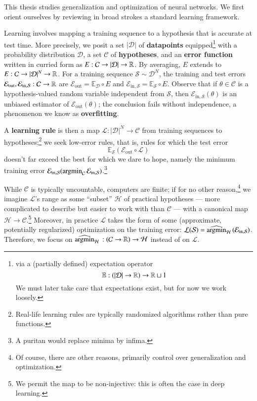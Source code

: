 \documentclass[openany, notitlepage, justified]{tufte-book}
\theoremstyle{plain}
\theoremstyle{definition}
\newcommand{\argmin}{\text{\textnormal{argmin}}}
\newcommand{\Cc}{\mathcal{C}}   \newcommand{\CC}{\mathbb{C}}
\newcommand{\Dd}{\mathcal{D}}
\newcommand{\Ee}{\mathcal{E}}   \newcommand{\EE}{\mathbb{E}}
\newcommand{\Hh}{\mathcal{H}}
\newcommand{\Ll}{\mathcal{L}}
\newcommand{\Ss}{\mathcal{S}}
\begin{document}
        This thesis studies generalization and optimization of neural networks.
        We first orient ourselves by reviewing in broad strokes a
        standard\cite{ab12, ra19} learning framework.

        \newcommand{\Eout}{\Ee_{\text{out}}}
        \newcommand{\Ein }{\Ee_{\text{in},\Ss}}
        \newcommand{\optH}{\widehat{\argmin}_{\Hh}\,}
        \newcommand{\amH }{\argmin_{\Hh}\,}
        \newcommand{\amC }{\argmin_{\Cc}\,}

        Learning involves mapping a training sequence to a hypothesis that is
        accurate at test time.  More precisely, we posit a set $|\Dd|$ of
        \textbf{datapoints} equipped\footnote{
            via a (partially defined) expectation operator
            $$\EE:(|\Dd|\to\RR)\to\RR\sqcup 1$$ 
            We must later take care that expectations exist, but
            for now we work loosely.
        } with a probability distribution $\Dd$,
        a set $\Cc$ of \textbf{hypotheses}, and an \textbf{error
        function} written in curried form as $E:\Cc\to|\Dd|\to\RR$.
        By averaging, $E$ extends to $E:\Cc\to|\Dd|^N\to\RR$.  For a
        training sequence $\Ss \sim \Dd^N$, the training and test
        errors $\Eout, \Ein: \Cc\to \RR$ are $\Eout = \EE_{\Dd} \circ E$ and
        $\Ein = \EE_{\Ss} \circ E$.  Observe that if $\theta\in \Cc$ is a
        hypothesis-valued random variable independent from $\Ss$, then
        $\Ein(\theta)$ is an unbiased estimator of $\Eout(\theta)$; the
        conclusion fails without independence, a phenomenon we know as
        \textbf{overfitting}.

        A \textbf{learning rule} is then a
        map $\Ll:|\Dd|^N\to \Cc$ from training sequences to hypotheses;\footnote{
            Real-life learning rules are typically randomized algorithms rather
            than pure functions.
        } we seek low-error rules, that is, rules for which the test error
        $$
            \EE_{\Ss}(\Eout \circ \Ll)
        $$
        doesn't far exceed the best for which we dare to hope, namely the
        minimum training error $\Ein(\amC\Ein)$.\footnote{
            A puritan would replace minima by infima.
        }

        While $\Cc$ is typically uncountable, computers are finite; if for no
        other reason,\footnote{
            Of course, there are other reasons, primarily control over
            generalization and optimization.
        }
        we imagine $\Ll$'s range as some ``subset'' $\Hh$ of practical hypotheses
        --- more complicated to describe but easier to work with than $\Cc$ ---  
        with a canonical map $\Hh \to \Cc$.\footnote{
            We permit the map to be non-injective: this is often the case in 
            deep learning.
        } Moreover, in practice $\Ll$ takes the form of
        some (approximate, potentially regularized) optimization on the
        training error: $\Ll(\Ss) = \optH(\Ein)$.  Therefore, we focus on
        $\optH:(\Cc\to\RR)\to \Hh$ instead of on $\Ll$.
\end{document}
